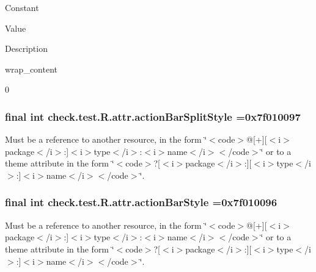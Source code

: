 Constant

Value

Description 

{\ttfamily wrap\+\_\+content}

0\hypertarget{classcheck_1_1test_1_1_r_1_1attr_a6557ab4a25c517d04661c987b9ddd3ef}{}
\subsubsection[{action\+Bar\+Split\+Style}]{\setlength{\rightskip}{0pt plus 5cm}final int check.\+test.\+R.\+attr.\+action\+Bar\+Split\+Style =0x7f010097\hspace{0.3cm}{\ttfamily [static]}}\label{classcheck_1_1test_1_1_r_1_1attr_a6557ab4a25c517d04661c987b9ddd3ef}
Must be a reference to another resource, in the form \char`\"{}$<$code$>$@\mbox{[}+\mbox{]}\mbox{[}$<$i$>$package$<$/i$>$\+:\mbox{]}$<$i$>$type$<$/i$>$\+:$<$i$>$name$<$/i$>$$<$/code$>$\char`\"{} or to a theme attribute in the form \char`\"{}$<$code$>$?\mbox{[}$<$i$>$package$<$/i$>$\+:\mbox{]}\mbox{[}$<$i$>$type$<$/i$>$\+:\mbox{]}$<$i$>$name$<$/i$>$$<$/code$>$\char`\"{}. \hypertarget{classcheck_1_1test_1_1_r_1_1attr_a10ba248fd78f9255e076be391a8965c7}{}
\subsubsection[{action\+Bar\+Style}]{\setlength{\rightskip}{0pt plus 5cm}final int check.\+test.\+R.\+attr.\+action\+Bar\+Style =0x7f010096\hspace{0.3cm}{\ttfamily [static]}}\label{classcheck_1_1test_1_1_r_1_1attr_a10ba248fd78f9255e076be391a8965c7}
Must be a reference to another resource, in the form \char`\"{}$<$code$>$@\mbox{[}+\mbox{]}\mbox{[}$<$i$>$package$<$/i$>$\+:\mbox{]}$<$i$>$type$<$/i$>$\+:$<$i$>$name$<$/i$>$$<$/code$>$\char`\"{} or to a theme attribute in the form \char`\"{}$<$code$>$?\mbox{[}$<$i$>$package$<$/i$>$\+:\mbox{]}\mbox{[}$<$i$>$type$<$/i$>$\+:\mbox{]}$<$i$>$name$<$/i$>$$<$/code$>$\char`\"{}. \hypertarget{classcheck_1_1test_1_1_r_1_1attr_a87898eccbaa7fa385bf19395d0a5b922}{}
